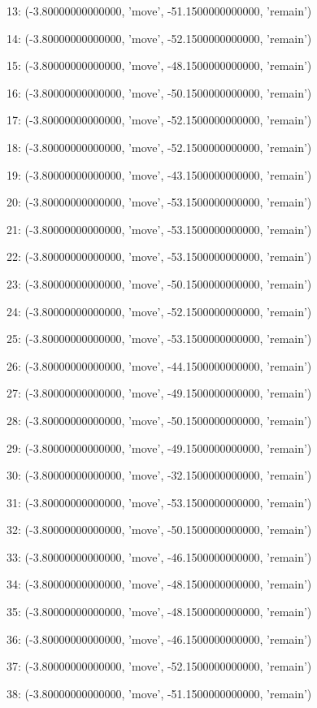 13: (-3.80000000000000, 'move', -51.1500000000000, 'remain')


14: (-3.80000000000000, 'move', -52.1500000000000, 'remain')


15: (-3.80000000000000, 'move', -48.1500000000000, 'remain')


16: (-3.80000000000000, 'move', -50.1500000000000, 'remain')


17: (-3.80000000000000, 'move', -52.1500000000000, 'remain')


18: (-3.80000000000000, 'move', -52.1500000000000, 'remain')


19: (-3.80000000000000, 'move', -43.1500000000000, 'remain')


20: (-3.80000000000000, 'move', -53.1500000000000, 'remain')


21: (-3.80000000000000, 'move', -53.1500000000000, 'remain')


22: (-3.80000000000000, 'move', -53.1500000000000, 'remain')


23: (-3.80000000000000, 'move', -50.1500000000000, 'remain')


24: (-3.80000000000000, 'move', -52.1500000000000, 'remain')


25: (-3.80000000000000, 'move', -53.1500000000000, 'remain')


26: (-3.80000000000000, 'move', -44.1500000000000, 'remain')


27: (-3.80000000000000, 'move', -49.1500000000000, 'remain')


28: (-3.80000000000000, 'move', -50.1500000000000, 'remain')


29: (-3.80000000000000, 'move', -49.1500000000000, 'remain')


30: (-3.80000000000000, 'move', -32.1500000000000, 'remain')


31: (-3.80000000000000, 'move', -53.1500000000000, 'remain')


32: (-3.80000000000000, 'move', -50.1500000000000, 'remain')


33: (-3.80000000000000, 'move', -46.1500000000000, 'remain')


34: (-3.80000000000000, 'move', -48.1500000000000, 'remain')


35: (-3.80000000000000, 'move', -48.1500000000000, 'remain')


36: (-3.80000000000000, 'move', -46.1500000000000, 'remain')


37: (-3.80000000000000, 'move', -52.1500000000000, 'remain')


38: (-3.80000000000000, 'move', -51.1500000000000, 'remain')


